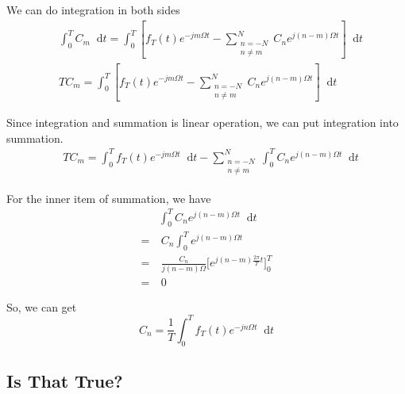 \documentclass[margin,line]{res}
\newcommand*{\dif}{\mathop{}\!\mathrm{d}}
\begin{document}
\begin{resume}
We can do integration in both sides
\begin{align}
&\int_{0}^{T}{C_m\dif t}=\int_{0}^{T}{\left[f_T(t) e^{-jm\Omega t}-
	\sum\limits_{ \substack{n=-N \\ n\neq m} }^{N}{C_n e^{j(n-m)\Omega t}}\right]
	\dif t} \nonumber \\
&TC_m=\int_{0}^{T}{\left[f_T(t) e^{-jm\Omega t}-
	\sum\limits_{ \substack{n=-N \\ n\neq m} }^{N}{C_n e^{j(n-m)\Omega t}}\right]
	\dif t} \nonumber
\end{align}

Since integration and summation is linear operation, we can put integration into summation.
\begin{align}
	&TC_m=\int_{0}^{T}{f_T(t) e^{-jm\Omega t}} \dif t -
		\sum\limits_{ \substack{n=-N \\ n\neq m} }^{N}{
			\int_{0}^{T}C_n e^{j(n-m)\Omega t} \dif t
		} \nonumber
\end{align}

For the inner item of summation, we have
\begin{align}
&\int_{0}^{T}{C_n e^{j(n-m)\Omega t} \dif t } \nonumber \\
=&\ C_n\int_{0}^{T} e^{j(n-m)\Omega t} \nonumber \\
=&\ \frac{C_n}{j(n-m)\Omega} \Big[ e^{ j(n-m) \frac{2\pi}{T} t} \Big]_{0}^{T} \nonumber \\
=&\ 0 \nonumber
\end{align}

So, we can get
$$
C_n=\frac{1}{T}\int_0^T{f_T(t) e^{-jn\Omega t} \dif t}
$$

\subsection{\textbf{Is That True?}}


\end{resume}
\end{document}
